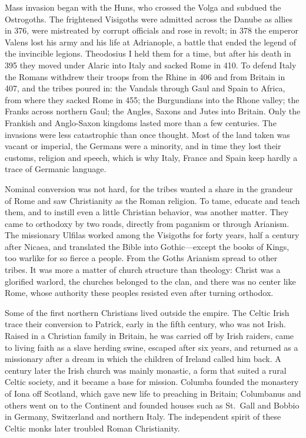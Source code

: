 Mass invasion began with the Huns, who crossed the Volga and subdued the Ostrogoths. The frightened
Visigoths were admitted across the Danube as allies in 376, were mistreated by corrupt officials and
rose in revolt; in 378 the emperor Valens lost his army and his life at Adrianople, a battle that
ended the legend of the invincible legions. Theodosius I held them for a time, but after his death in
395 they moved under Alaric into Italy and sacked Rome in 410. To defend Italy the Romans withdrew
their troops from the Rhine in 406 and from Britain in 407, and the tribes poured in: the Vandals
through Gaul and Spain to Africa, from where they sacked Rome in 455; the Burgundians into the Rhone
valley; the Franks across northern Gaul; the Angles, Saxons and Jutes into Britain. Only the Frankish
and Anglo-Saxon kingdoms lasted more than a few centuries. The invasions were less catastrophic than
once thought. Most of the land taken was vacant or imperial, the Germans were a minority, and in time
they lost their customs, religion and speech, which is why Italy, France and Spain keep hardly a
trace of Germanic language.

Nominal conversion was not hard, for the tribes wanted a share in the grandeur of Rome and saw
Christianity as the Roman religion. To tame, educate and teach them, and to instill even a little
Christian behavior, was another matter. They came to orthodoxy by two roads, directly from paganism or
through Arianism. The missionary Ulfilas worked among the Visigoths for forty years, half a century
after Nicaea, and translated the Bible into Gothic---except the books of Kings, too warlike for so
fierce a people. From the Goths Arianism spread to other tribes. It was more a matter of church
structure than theology: Christ was a glorified warlord, the churches belonged to the clan, and there
was no center like Rome, whose authority these peoples resisted even after turning orthodox.

Some of the first northern Christians lived outside the empire. The Celtic Irish trace their
conversion to Patrick, early in the fifth century, who was not Irish. Raised in a Christian family in
Britain, he was carried off by Irish raiders, came to living faith as a slave herding swine, escaped
after six years, and returned as a missionary after a dream in which the children of Ireland called
him back. A century later the Irish church was mainly monastic, a form that suited a rural Celtic
society, and it became a base for mission. Columba founded the monastery of Iona off Scotland, which
gave new life to preaching in Britain; Columbanus and others went on to the Continent and founded
houses such as St.~Gall and Bobbio in Germany, Switzerland and northern Italy. The independent spirit
of these Celtic monks later troubled Roman Christianity.

